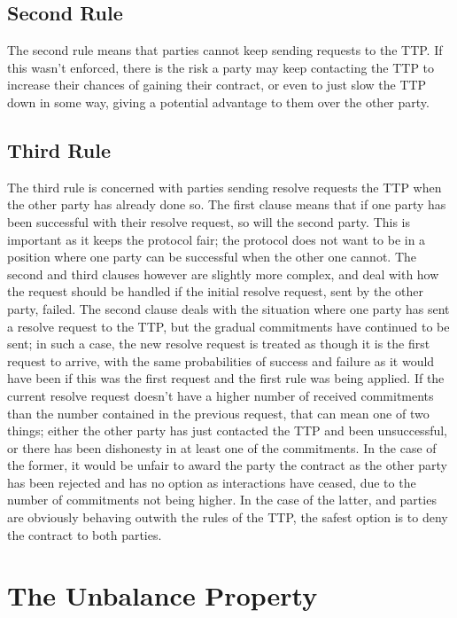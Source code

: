 \documentclass{l4proj}
\begin{document}
\subsection{Second Rule}
The second rule means that parties cannot keep sending requests to the TTP. If this wasn't enforced, there is the risk a party may keep contacting the TTP  to increase their chances of gaining their contract, or even to just slow the TTP down in some way, giving a potential advantage to them over the other party.

\subsection{Third Rule}
The third rule is concerned with parties sending resolve requests the TTP when the other party has already done so. The first clause means that if one party has been successful with their resolve request, so will the second party. This is important as it keeps the protocol fair; the protocol does not want to be in a position where one party can be successful when the other one cannot. The second and third clauses however are slightly more complex, and deal with how the request should be handled if the initial resolve request, sent by the other party, failed. The second clause deals with the situation where one party has sent a resolve request to the TTP, but the gradual commitments have continued to be sent; in such a case, the new resolve request is treated as though it is the first request to arrive, with the same probabilities of success and failure as it would have been if this was the first request and the first rule was being applied.
If the current resolve request doesn't have a higher number of received commitments than the number contained in the previous request, that can mean one of two things; either the other party has just contacted the TTP and been unsuccessful, or there has been dishonesty in at least one of the commitments. In the case of the former, it would be unfair to award the party the contract as the other party has been rejected and has no option as interactions have ceased, due to the number of commitments not being higher. In the case of the latter, and parties are obviously behaving outwith the rules of the TTP, the safest option is to deny the contract to both parties.

\section{The Unbalance Property}
\end{document}
